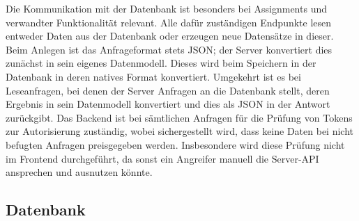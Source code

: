 Die Kommunikation mit der Datenbank ist besonders bei Assignments und verwandter Funktionalität relevant.
Alle dafür zuständigen Endpunkte lesen entweder Daten aus der Datenbank oder erzeugen neue Datensätze in dieser.
Beim Anlegen ist das Anfrageformat stets JSON;
der Server konvertiert dies zunächst in sein eigenes Datenmodell.
Dieses wird beim Speichern in der Datenbank in deren natives Format konvertiert.
Umgekehrt ist es bei Leseanfragen, bei denen der Server Anfragen an die Datenbank stellt,
deren Ergebnis in sein Datenmodell konvertiert und dies als JSON in der Antwort zurückgibt.
Das Backend ist bei sämtlichen Anfragen für die Prüfung von Tokens zur Autorisierung zuständig,
wobei sichergestellt wird, dass keine Daten bei nicht befugten Anfragen preisgegeben werden.
Insbesondere wird diese Prüfung nicht im Frontend durchgeführt,
da sonst ein Angreifer manuell die Server-API ansprechen und ausnutzen könnte.

\subsection{Datenbank}\label{subsec:database}

